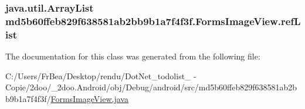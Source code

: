 \hypertarget{classmd5b60ffeb829f638581ab2bb9b1a7f4f3f_1_1_forms_image_view_b74a069616f95c91db7f837088703764}{
\subsubsection[{refList}]{\setlength{\rightskip}{0pt plus 5cm}java.util.ArrayList {\bf md5b60ffeb829f638581ab2bb9b1a7f4f3f.FormsImageView.refList}}}
\label{classmd5b60ffeb829f638581ab2bb9b1a7f4f3f_1_1_forms_image_view_b74a069616f95c91db7f837088703764}




The documentation for this class was generated from the following file:\begin{CompactItemize}
\item 
C:/Users/FrBea/Desktop/rendu/DotNet\_\-todolist\_ - Copie/2doo/\_\-2doo.Android/obj/Debug/android/src/md5b60ffeb829f638581ab2bb9b1a7f4f3f/\hyperlink{_forms_image_view_8java}{FormsImageView.java}\end{CompactItemize}
